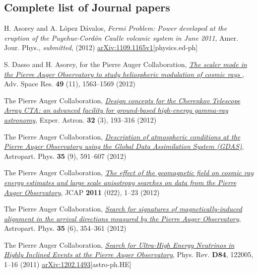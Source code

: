 \documentclass[11pt, a4paper]{article}
\newcommand{\years}[1]{\marginnote{\scriptsize #1}}
\begin{document}
\subsection*{Complete list of Journal papers}

\begin{etaremune}
\item \years{2012}H. Asorey and A. López Dávalos, {\emph{Fermi Problem: Power developed
at the eruption of the Puyehue-Cordón Caulle volcanic system in June 2011}},
Amer. Jour. Phys., {\emph{submitted}}, (2012)
\href{http://arxiv.org/abs/1109.1165}{arXiv:1109.1165v1}[physics.ed-ph]

\item \years{2012}S. Dasso and H. Asorey, for the Pierre Auger Collaboration,
\href{http://dx.doi.org/10.1016/j.asr.2011.12.028}{\emph{ The scaler mode in
the Pierre Auger Observatory to study heliospheric modulation of cosmic rays
}}, Adv. Space Res. {\bf{49}} (11), 1563--1569 (2012)

\item \years{2012}The Pierre Auger Collaboration,
\href{http://dx.doi.org/10.1007/s10686-011-9247-0}{\emph{Design concepts for
the Cherenkov Telescope Array CTA: an advanced facility for ground-based
high-energy gamma-ray astronomy}}, Exper. Astron. {\bf{32}} (3), 193--316
(2012)

\item \years{2012}The Pierre Auger Collaboration, 
\href{http://dx.doi.org/10.1016/j.astropartphys.2011.12.002}{\emph{Description
of atmospheric conditions at the Pierre Auger Observatory using the Global Data
Assimilation System (GDAS)}}, Astropart. Phys. {\bf{35}} (9), 591--607 (2012)

\item \years{2012}The Pierre Auger Collaboration, 
\href{http://dx.doi.org/10.1088/1475-7516/2011/11/022}{\emph{The effect of the
geomagnetic field on cosmic ray energy estimates and large scale anisotropy
searches on data from the Pierre Auger Observatory}}, JCAP {\bf{2011}} (022),
1--23 (2012)

\item \years{2012}The Pierre Auger Collaboration, 
\href{http://dx.doi.org/10.1016/j.astropartphys.2011.10.004}{\emph{Search for
signatures of magnetically-induced alignment in the arrival directions measured
by the Pierre Auger Observatory}}, Astropart. Phys. {\bf{35}} (6), 354--361
(2012)

\item \years{2011}The Pierre Auger Collaboration,
\href{http://dx.doi.org/10.1016/10.1103/PhysRevD.84.122005}{\emph{Search for
Ultra-High Energy Neutrinos in Highly Inclined Events at the Pierre Auger
Observatory}}, Phys.  Rev. {\bf D84}, 122005, 1--16 (2011)
\href{http://arxiv.org/abs/1202.1493}{arXiv:1202.1493}[astro-ph.HE]


\end{etaremune}
\end{document}
